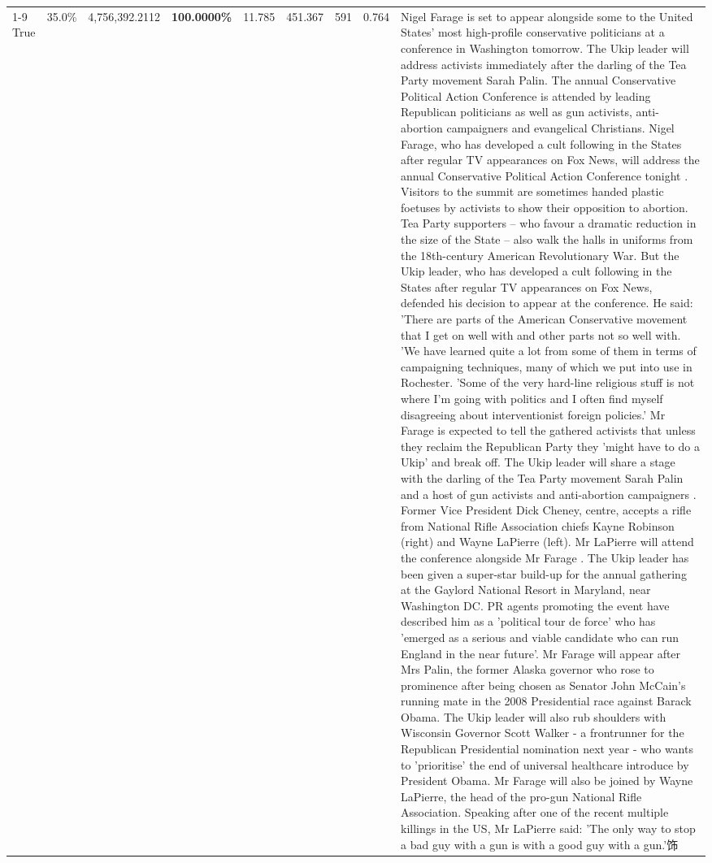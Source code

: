 \begin{table}[H]
\begin{tabular}{lllrlllll}
\cline{1-9}
True & 35.0\% & 4,756,392.2112 & \bfseries \color{red} 100.0000\% & 11.785 & 451.367 & 591 & 0.764 & Nigel Farage is set to appear alongside some to the United States' most high-profile conservative politicians at a conference in Washington tomorrow. The Ukip leader will address activists immediately after the darling of the Tea Party movement Sarah Palin. The annual Conservative Political Action Conference is attended by leading Republican politicians as well as gun activists, anti-abortion campaigners and evangelical Christians. Nigel Farage, who has developed a cult following in the States after regular TV appearances on Fox News, will address the annual Conservative Political Action Conference tonight . Visitors to the summit are sometimes handed plastic foetuses by activists to show their opposition to abortion. Tea Party supporters – who favour a dramatic reduction in the size of the State – also walk the halls in uniforms from the 18th-century American Revolutionary War. But the Ukip leader, who has developed a cult following in the States after regular TV appearances on Fox News, defended his decision to appear at the conference. He said: 'There are parts of the American Conservative movement that I get on well with and other parts not so well with. 'We have learned quite a lot from some of them in terms of campaigning techniques, many of which we put into use in Rochester. 'Some of the very hard-line religious stuff is not where I'm going with politics and I often find myself disagreeing about interventionist foreign policies.' Mr Farage is expected to tell the gathered activists that unless they reclaim the Republican Party they 'might have to do a Ukip' and break off. The Ukip leader will share a stage with the darling of the Tea Party movement Sarah Palin and a host of gun activists and anti-abortion campaigners . Former Vice President Dick Cheney, centre, accepts a rifle from National Rifle Association chiefs Kayne Robinson (right) and Wayne LaPierre (left). Mr LaPierre will attend the conference alongside Mr Farage . The Ukip leader has been given a super-star build-up for the annual gathering at the Gaylord National Resort in Maryland, near Washington DC. PR agents promoting the event have described him as a 'political tour de force' who has 'emerged as a serious and viable candidate who can run England in the near future'. Mr Farage will appear after Mrs Palin, the former Alaska governor who rose to prominence after being chosen as Senator John McCain's running mate in the 2008 Presidential race against Barack Obama. The Ukip leader will also rub shoulders with Wisconsin Governor Scott Walker - a frontrunner for the Republican Presidential nomination next year - who wants to 'prioritise' the end of universal healthcare introduce by President Obama. Mr Farage will also be joined by Wayne LaPierre, the head of the pro-gun National Rifle Association. Speaking after one of the recent multiple killings in the US, Mr LaPierre said: 'The only way to stop a bad guy with a gun is with a good guy with a gun.'饰 \\

\end{tabular}
\end{table}
